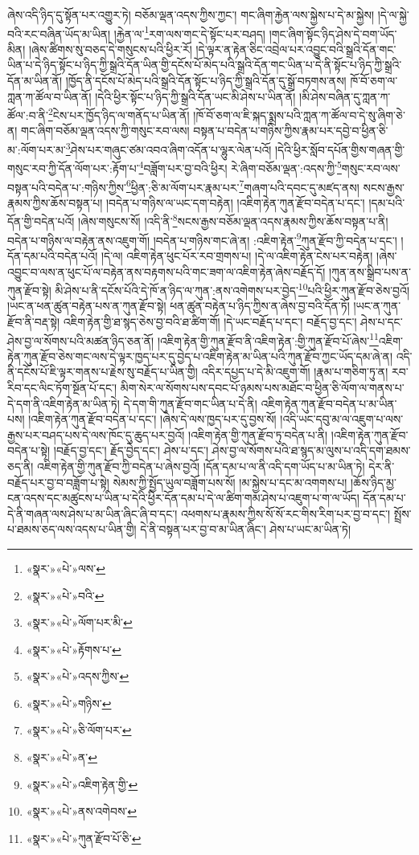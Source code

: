 ཞེས་འདི་ཉིད་དུ་སྟོན་པར་འགྱུར་ཏེ། བཅོམ་ལྡན་འདས་ཀྱིས་ཀྱང་། གང་ཞིག་རྐྱེན་ལས་སྐྱེས་པ་དེ་མ་སྐྱེས། །དེ་ལ་སྐྱེ་བའི་རང་བཞིན་ཡོད་མ་ཡིན། །རྐྱེན་ལ་\footnote{«སྣར་»«པེ་»ལས་}རག་ལས་གང་དེ་སྟོང་པར་བཤད། །གང་ཞིག་སྟོང་ཉིད་ཤེས་དེ་བག་ཡོད་མིན། །ཞེས་ཚིགས་སུ་བཅད་དེ་གསུངས་པའི་ཕྱིར་རོ། །དེ་ལྟར་ན་རྟེན་ཅིང་འབྲེལ་པར་འབྱུང་བའི་སྒྲའི་དོན་གང་ཡིན་པ་དེ་ཉིད་སྟོང་པ་ཉིད་ཀྱི་སྒྲའི་དོན་ཡིན་གྱི་དངོས་པོ་མེད་པའི་སྒྲའི་དོན་གང་ཡིན་པ་དེ་ནི་སྟོང་པ་ཉིད་ཀྱི་སྒྲའི་དོན་མ་ཡིན་ནོ། །ཁྱོད་ནི་དངོས་པོ་མེད་པའི་སྒྲའི་དོན་སྟོང་པ་ཉིད་ཀྱི་སྒྲའི་དོན་དུ་སྒྲོ་བཏགས་ནས། ཁོ་བོ་ཅག་ལ་ཀླན་ཀ་ཚོལ་བ་ཡིན་ནོ། །དེའི་ཕྱིར་སྟོང་པ་ཉིད་ཀྱི་སྒྲའི་དོན་ཡང་མི་ཤེས་པ་ཡིན་ནོ། །མི་ཤེས་བཞིན་དུ་ཀླན་ཀ་ཚོལ་:བ་ནི་\footnote{«སྣར་»«པེ་»བའི་}ངེས་པར་ཁྱོད་ཉིད་ལ་གནོད་པ་ཡིན་ནོ། །ཁོ་བོ་ཅག་ལ་ཇི་སྐད་སྨྲས་པའི་ཀླན་ཀ་ཚོལ་བ་དེ་སུ་ཞིག་ཅེ་ན། གང་ཞིག་བཅོམ་ལྡན་འདས་ཀྱི་གསུང་རབ་ལས། བསྟན་པ་བདེན་པ་གཉིས་ཀྱིས་རྣམ་པར་དབྱེ་བ་ཕྱིན་ཅི་མ་:ལོག་པར་མ་\footnote{«སྣར་»«པེ་»ལོག་པར་མི་}ཤེས་པར་གཞུང་ཙམ་འབའ་ཞིག་འདོན་པ་ལྷུར་ལེན་པའོ། །དེའི་ཕྱིར་སློབ་དཔོན་གྱིས་གཞན་གྱི་གསུང་རབ་ཀྱི་དོན་ལོག་པར་:རྟོག་པ་\footnote{«སྣར་»«པེ་»རྟོགས་པ་}བཟློག་པར་བྱ་བའི་ཕྱིར། རེ་ཞིག་བཅོམ་ལྡན་:འདས་ཀྱི་\footnote{«སྣར་»«པེ་»འདས་ཀྱིས་}གསུང་རབ་ལས་བསྟན་པའི་བདེན་པ་:གཉིས་ཀྱིས་\footnote{«སྣར་»«པེ་»གཉིས་}ཕྱིན་:ཅི་མ་ལོག་པར་རྣམ་པར་\footnote{«སྣར་»«པེ་»ཅི་ལོག་པར་}གཞག་པའི་དབང་དུ་མཛད་ནས། སངས་རྒྱས་རྣམས་ཀྱིས་ཆོས་བསྟན་པ། །བདེན་པ་གཉིས་ལ་ཡང་དག་བརྟེན། །འཇིག་རྟེན་ཀུན་རྫོབ་བདེན་པ་དང་། །དམ་པའི་དོན་གྱི་བདེན་པའོ། །ཞེས་གསུངས་སོ། །འདི་ནི་\footnote{«སྣར་»«པེ་»ན་}སངས་རྒྱས་བཅོམ་ལྡན་འདས་རྣམས་ཀྱིས་ཆོས་བསྟན་པ་ནི། བདེན་པ་གཉིས་ལ་བརྟེན་ནས་འཇུག་གོ། །བདེན་པ་གཉིས་གང་ཞེ་ན། :འཇིག་རྟེན་\footnote{«སྣར་»«པེ་»འཇིག་རྟེན་གྱི་}ཀུན་རྫོབ་ཀྱི་བདེན་པ་དང་། །དོན་དམ་པའི་བདེན་པའོ། །དེ་ལ། འཇིག་རྟེན་ཕུང་པོར་རབ་གྲགས་པ། །དེ་ལ་འཇིག་རྟེན་ངེས་པར་བརྟེན། །ཞེས་འབྱུང་བ་ལས་ན་ཕུང་པོ་ལ་བརྟེན་ནས་བརྟགས་པའི་གང་ཟག་ལ་འཇིག་རྟེན་ཞེས་བརྗོད་དོ། །ཀུན་ནས་སྒྲིབ་པས་ན་ཀུན་རྫོབ་སྟེ། མི་ཤེས་པ་ནི་དངོས་པོའི་དེ་ཁོ་ན་ཉིད་ལ་ཀུན་:ནས་འགེགས་པར་བྱེད་\footnote{«སྣར་»«པེ་»ནས་འགེབས་}པའི་ཕྱིར་ཀུན་རྫོབ་ཅེས་བྱའོ། །ཡང་ན་ཕན་ཚུན་བརྟེན་པས་ན་ཀུན་རྫོབ་སྟེ། ཕན་ཚུན་བརྟེན་པ་ཉིད་ཀྱིས་ན་ཞེས་བྱ་བའི་དོན་ཏོ། །ཡང་ན་ཀུན་རྫོབ་ནི་བརྡ་སྟེ། འཇིག་རྟེན་གྱི་ཐ་སྙད་ཅེས་བྱ་བའི་ཐ་ཚིག་གོ། །དེ་ཡང་བརྗོད་པ་དང་། བརྗོད་བྱ་དང་། ཤེས་པ་དང་ཤེས་བྱ་ལ་སོགས་པའི་མཚན་ཉིད་ཅན་ནོ། །འཇིག་རྟེན་གྱི་ཀུན་རྫོབ་ནི་འཇིག་རྟེན་:གྱི་ཀུན་རྫོབ་པོ་ཞེས་\footnote{«སྣར་»«པེ་»ཀུན་རྫོབ་པོ་ཅི་}འཇིག་རྟེན་ཀུན་རྫོབ་ཅེས་གང་ལས་དེ་ལྟར་ཁྱད་པར་དུ་བྱེད་པ་འཇིག་རྟེན་མ་ཡིན་པའི་ཀུན་རྫོབ་ཀྱང་ཡོད་དམ་ཞེ་ན། འདི་ནི་དངོས་པོ་ཇི་ལྟར་གནས་པ་རྗེས་སུ་བརྗོད་པ་ཡིན་གྱི། འདིར་དཔྱད་པ་དེ་མི་འཇུག་གོ། །རྣམ་པ་གཅིག་ཏུ་ན། རབ་རིབ་དང་ལིང་ཏོག་སྔོན་པོ་དང་། མིག་སེར་ལ་སོགས་པས་དབང་པོ་ཉམས་པས་མཐོང་བ་ཕྱིན་ཅི་ལོག་ལ་གནས་པ་དེ་དག་ནི་འཇིག་རྟེན་མ་ཡིན་ཏེ། དེ་དག་གི་ཀུན་རྫོབ་གང་ཡིན་པ་དེ་ནི། འཇིག་རྟེན་ཀུན་རྫོབ་བདེན་པ་མ་ཡིན་པས། །འཇིག་རྟེན་ཀུན་རྫོབ་བདེན་པ་དང་། །ཞེས་དེ་ལས་ཁྱད་པར་དུ་བྱས་སོ། །འདི་ཡང་དབུ་མ་ལ་འཇུག་པ་ལས་རྒྱས་པར་བཤད་པས་དེ་ལས་ཁོང་དུ་ཆུད་པར་བྱའོ། །འཇིག་རྟེན་གྱི་ཀུན་རྫོབ་ཏུ་བདེན་པ་ནི། །འཇིག་རྟེན་ཀུན་རྫོབ་བདེན་པ་སྟེ། །བརྗོད་བྱ་དང་། རྗོད་བྱེད་དང་། ཤེས་པ་དང་། ཤེས་བྱ་ལ་སོགས་པའི་ཐ་སྙད་མ་ལུས་པ་འདི་དག་ཐམས་ཅད་ནི། འཇིག་རྟེན་གྱི་ཀུན་རྫོབ་ཀྱི་བདེན་པ་ཞེས་བྱའོ། །དོན་དམ་པ་ལ་ནི་འདི་དག་ཡོད་པ་མ་ཡིན་ཏེ། དེར་ནི་བརྗོད་པར་བྱ་བ་བཟློག་པ་སྟེ། སེམས་ཀྱི་སྤྱོད་ཡུལ་བཟློག་པས་སོ། །མ་སྐྱེས་པ་དང་མ་འགགས་པ། །ཆོས་ཉིད་མྱ་ངན་འདས་དང་མཚུངས་པ་ཡིན་པ་དེའི་ཕྱིར་དོན་དམ་པ་དེ་ལ་ཚིག་གམ་ཤེས་པ་འཇུག་པ་ག་ལ་ཡོད། དོན་དམ་པ་དེ་ནི་གཞན་ལས་ཤེས་པ་མ་ཡིན་ཞིང་ཞི་བ་དང་། འཕགས་པ་རྣམས་ཀྱིས་སོ་སོ་རང་གིས་རིག་པར་བྱ་བ་དང་། སྤྲོས་པ་ཐམས་ཅད་ལས་འདས་པ་ཡིན་གྱི། དེ་ནི་བསྟན་པར་བྱ་བ་མ་ཡིན་ཞིང་། ཤེས་པ་ཡང་མ་ཡིན་ཏེ། 